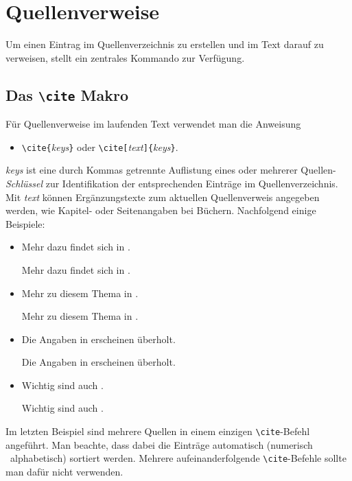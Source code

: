 \section{Quellenverweise}

Um einen Eintrag im Quellenverzeichnis zu erstellen und im Text darauf zu verweisen, stellt 
\latex ein zentrales Kommando zur Verfügung.

\subsection{Das \texttt{\textbackslash cite} Makro}

Für Quellenverweise im laufenden Text verwendet man die Anweisung
\begin{itemize}
\item[] \verb!\cite{!\textit{keys}\verb!}! 
				\quad oder \quad
        \verb!\cite[!\textit{text}\verb!]{!\textit{keys}\verb!}!.
\end{itemize}

\noindent%
\textit{keys} ist eine durch Kommas getrennte Auflistung eines oder mehrerer Quellen-\emph{Schlüssel} zur
Identifikation der entsprechenden Einträge im Quellenverzeichnis. Mit \textit{text} können Ergänzungstexte zum
aktuellen Quellenverweis angegeben werden, wie \zB Kapitel- oder Seitenangaben bei Büchern. Nachfolgend einige
Beispiele:
%
\begin{itemize}
\item
Mehr dazu findet sich in \cite{Kopka2003}.
\begin{LaTeXCode}[numbers=none]
Mehr dazu findet sich in \cite{Kopka2003}.
\end{LaTeXCode}
%
\item
Mehr zu diesem Thema in \cite[Kap.~3]{Kopka2003}.
\begin{LaTeXCode}[numbers=none]
Mehr zu diesem Thema in \cite[Kap.~3]{Kopka2003}.
\end{LaTeXCode}
%
\item
Die Angaben in \cite[S.\ 274--277]{BurgeBurger1999} erscheinen überholt.
\begin{LaTeXCode}[numbers=none]
Die Angaben in \cite[S.\ 274--277]{BurgeBurger1999} erscheinen überholt.
\end{LaTeXCode}
%
\item
Wichtig sind auch \cite{Patashnik1988,Feder2006,Duden1997}.
\begin{LaTeXCode}[numbers=none]
Wichtig sind auch \cite{Patashnik1988,Feder2006,Duden1997}.
\end{LaTeXCode}
\end{itemize}
%
Im letzten Beispiel sind mehrere Quellen in einem einzigen \texttt{\textbackslash cite}-Befehl angeführt. Man
beachte, dass dabei die Einträge automatisch (numerisch \bzw\ alphabetisch) sortiert werden. Mehrere
aufeinanderfolgende \texttt{\textbackslash cite}-Befehle sollte man dafür nicht verwenden.

